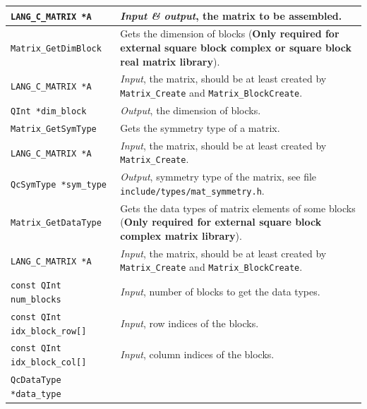 \documentclass[a4paper,11pt,twoside,openright]{book}
\begin{document}
\begin{center}
\begin{longtable}{l|p{}}
    \hspace*{2ex}\verb|LANG_C_MATRIX *A| %
      & \textsl{Input \& output}, the matrix to be assembled.\\
    \hline
%
    \verb|Matrix_GetDimBlock|\index{\texttt{Matrix\_GetDimBlock}} %
      & Gets the dimension of blocks %
        (\textbf{Only required for external square block complex or
        square block real matrix library}).\\
    \hspace*{2ex}\verb|LANG_C_MATRIX *A| %
      & \textsl{Input}, the matrix, should be at least created by \verb|Matrix_Create|
        and \verb|Matrix_BlockCreate|.\\
    \hspace*{2ex}\verb|QInt *dim_block| %
      & \textsl{Output}, the dimension of blocks.\\
    \hline
%
    \verb|Matrix_GetSymType|\index{\texttt{Matrix\_GetSymType}} %
      & Gets the symmetry type of a matrix.\\
    \hspace*{2ex}\verb|LANG_C_MATRIX *A| %
      & \textsl{Input}, the matrix, should be at least created by \verb|Matrix_Create|.\\
    \hspace*{2ex}\verb|QcSymType *sym_type| %
      & \textsl{Output}, symmetry type of the matrix, see file
        \verb|include/types/mat_symmetry.h|.\\
    \hline
%
    \verb|Matrix_GetDataType|\index{\texttt{Matrix\_GetDataType}} %
      & Gets the data types of matrix elements of some blocks %
        (\textbf{Only required for external square block complex matrix library}).\\
    \hspace*{2ex}\verb|LANG_C_MATRIX *A| %
      & \textsl{Input}, the matrix, should be at least created by \verb|Matrix_Create|
        and \verb|Matrix_BlockCreate|.\\
    \hspace*{2ex}\verb|const QInt num_blocks| %
      & \textsl{Input}, number of blocks to get the data types.\\
    \hspace*{2ex}\verb|const QInt idx_block_row[]| %
      & \textsl{Input}, row indices of the blocks.\\
    \hspace*{2ex}\verb|const QInt idx_block_col[]| %
      & \textsl{Input}, column indices of the blocks.\\
    \hspace*{2ex}\verb|QcDataType *data_type| %

\end{longtable}
\end{center}
\end{document}
